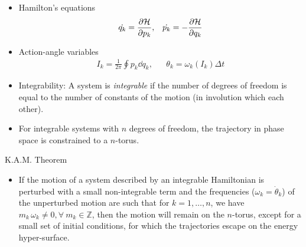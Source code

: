 \documentclass[a4,compress]{beamer}
\begin{document}
\begin{frame}
  \begin{itemize}
    \item Hamilton's equations
    \begin{align*}
      \dot{q_k} = \pdv{\mathcal{H}}{p_k}, &&
      \dot{p_k} = -\pdv{\mathcal{H}}{q_k}
    \end{align*}
    \item Action-angle variables
    \begin{align*}
      I_k = \frac{1}{2\pi}\oint p_k \dd{q_k}, &&
      \theta_k = \omega_k(I_k) \Delta t
    \end{align*}
    \item Integrability: A system is \emph{integrable} if the number of degrees
    of freedom is equal to the number of constants of the motion
    (in involution which each other).
    \item For integrable systems with $n$ degrees of freedom, the trajectory
    in phase space is constrained to a $n$-torus.
  \end{itemize}
\end{frame}


\begin{frame}{K.A.M. Theorem}
  \begin{itemize}
    \item If the motion of a system described by an integrable
    Hamiltonian is perturbed with a small non-integrable term and
    the frequencies (\(\omega_k = \dot{\theta}_k\)) of the unperturbed motion
    are such that for \(k=1,\dotsc,n\), we have
    \(m_k\, \omega_k \neq 0, \forall\ m_k \in \mathbb{Z}\),
    then the motion will remain on the $n$-torus, except for a small
    set of initial conditions, for which the trajectories escape on the
    energy hyper-surface.

  \end{itemize}
\end{frame}

\end{document}
